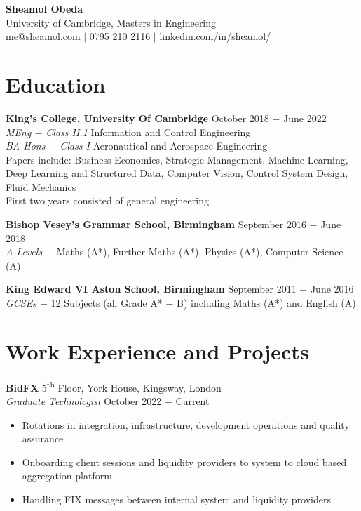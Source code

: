 \documentclass{article}
\begin{document}
\begin{center}

\LARGE \textbf{Sheamol Obeda\\}
\Large {\color{DarkSlateBlue} University of Cambridge, Masters in Engineering}\\
\normalsize \href{mailto: me@sheamol.com}{me@sheamol.com} $\mid$ 0795 210 2116 $\mid$ \href{https://www.linkedin.com/in/sheamol/}{linkedin.com/in/sheamol/}\\
\vspace{-.5\baselineskip}
\hrulefill
\vspace{-.5\baselineskip}
\end{center}

\section*{Education}

\textbf{King's College, University Of Cambridge}  \hfill October 2018 $-$ June 2022\\
\textit{MEng $-$ Class II.1} Information and Control Engineering\\
\textit{BA Hons $-$ Class I} Aeronautical and Aerospace Engineering \\
Papers include: Business Economics, Strategic Management, Machine Learning, Deep Learning and Structured Data, Computer Vision, Control System Design,  Fluid Mechanics \\
First two years consisted of general engineering \medskip

\textbf{Bishop Vesey's Grammar School, Birmingham} \hfill September 2016 $-$ June 2018 \\
\textit{A Levels $-$} Maths (A*), Further Maths (A*), Physics (A*), Computer Science (A) \medskip

\textbf{King Edward VI Aston School, Birmingham} \hfill September 2011 $-$ June 2016 \\
\textit{GCSEs $-$} 12 Subjects (all Grade A* $-$  B) including Maths (A*) and English (A)

\vspace{-.5\baselineskip}
\hrulefill
\vspace{-.5\baselineskip}

\section*{Work Experience and Projects}

\textbf{BidFX} \hfill 5\textsuperscript{th} Floor, York House, Kingsway, London\\
\textit{Graduate Technologist} \hfill October 2022 $-$ Current
\begin{itemize}
    \item Rotations in integration, infrastructure, development operations and quality assurance
    \item Onboarding client sessions and liquidity providers to system to cloud based aggregation platform
    \item Handling FIX messages between internal system and liquidity providers
\end{itemize} \medskip
\end{document}
